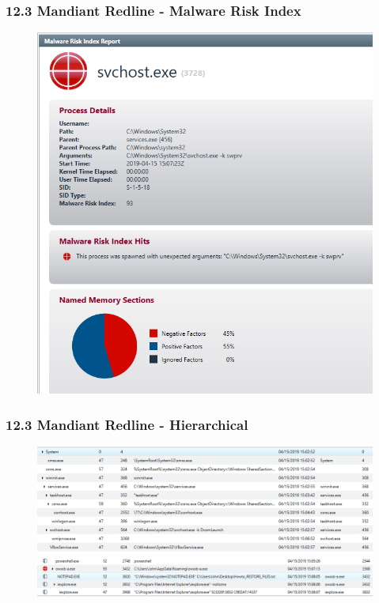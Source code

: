 \begin{frame}
  \frametitle{12.3 Mandiant Redline - Malware Risk Index}
  \begin{figure}
    \begin{center}
      \includegraphics[scale=0.35]{images/f12_redline-4.png}
    \end{center}
  \end{figure}
\end{frame}

\begin{frame}
  \frametitle{12.3 Mandiant Redline - Hierarchical}
  \begin{figure}
    \begin{center}
      \includegraphics[scale=0.42]{images/f12_redline-5.png}

      \vspace{0.2cm}

      \includegraphics[scale=0.4]{images/f12_redline-7.png}
    \end{center}
  \end{figure}
\end{frame}

